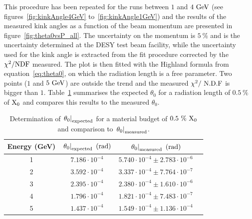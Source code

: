    This procedure has been repeated for the runs between $1$ and $4~\rm{GeV}$ (see figures~\ref{fig:kinkAngle4GeV} to~\ref{fig:kinkAngle1GeV}) and the results of the measured kink angles as a function of the beam momentum are presented in figure~\ref{fig:theta0vsP_all}. 
   The uncertainty on the momentum is $5~\%$ and is the uncertainty determined at the DESY test beam facility, while the uncertainty used for the kink angle is extracted from the fit procedure corrected by the $\chi^2 / \rm{NDF}$ measured.
   The plot is then fitted with the Highland formula from equation~\ref{eq:theta0}, on which the radiation length is a free parameter.
   Two points ($1$ and $5~\rm{GeV}$) are outside the trend and the measured $\chi^2 /~\rm{N.D.F}$ is bigger than $1$.
   Table~\ref{tab:theta0Calcultation} summarises the expected $\theta_0$ for a radiation length of $0.5~\%$ of $\rm{X_0}$ and compares this results to the measured $\theta_0$.

   \begin{table}
     \centering
     \begin{tabular}{c c c c}
        \hline %
        Energy (GeV)	& $\left. \theta_0\right|_{\rm{expected}}~(\rm{rad})$ & $\left. \theta_0\right|_{\rm{measured}}~(\rm{rad})$ \tabularnewline
        \hline %
        \hline %

        	1	  &		$7.186 \cdot 10^{-4}$	  &		$5.740 \cdot 10^{-4} \pm 2.783 \cdot 10^{-6}$	      \tabularnewline
        	2		&		$3.592 \cdot 10^{-4}$	  &		$3.337 \cdot 10^{-4} \pm 7.764 \cdot 10^{-7}$	      \tabularnewline
        	3		&		$2.395 \cdot 10^{-4}$	  &		$2.380 \cdot 10^{-4} \pm 1.610 \cdot 10^{-6}$       \tabularnewline
        	4		&		$1.796 \cdot 10^{-4}$	  &	  $1.821 \cdot 10^{-4} \pm 7.483 \cdot 10^{-7}$       \tabularnewline
        	5		&		$1.437 \cdot 10^{-4}$   &		$1.549 \cdot 10^{-4} \pm 1.136 \cdot 10^{-4}$	      \tabularnewline
        \hline %
     
     \end{tabular}
     \caption{Determination of $\left. \theta_0\right|_{\rm{expected}}$ for a material budget of $0.5~\%~\rm{X_0}$ and comparison to $\left. \theta_0\right|_{\rm{measured}}$.}
     \label{tab:theta0Calcultation}
   \end{table}

